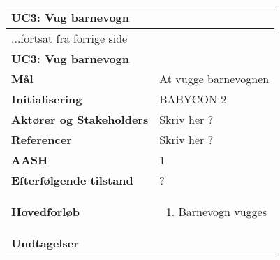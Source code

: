 \begin{center} \centering \label{kravspec:uc3}
	\begin{longtable}{|p{5cm}|p{9cm}|}  %
	\hline
		\multicolumn{2}{|l|}{\textbf{UC3: Vug barnevogn}} \\\hline %
		\endfirsthead
		
		\multicolumn{2}{l}{...fortsat fra forrige side} \\ \hline %
		\multicolumn{2}{|l|}{\textbf{UC3: Vug barnevogn}} \\\hline %
		\endhead	
		
		\textbf{Mål}							&At vugge barnevognen		\\\hline
		\textbf{Initialisering}				&BABYCON 2 		\\\hline
		\textbf{Aktører og Stakeholders}		&Skriv her ?		\\\hline 
		\textbf{Referencer}					&Skriv her ?		\\\hline
		\textbf{AASH}						&1		\\\hline
		\textbf{Efterfølgende tilstand}		&?	\\\hline
		\textbf{Hovedforløb}					
			&\begin{enumerate}
	
				\item  Barnevogn vugges
				
				
				
			\end{enumerate}
		\\\hline
		\textbf{Undtagelser}
			&\begin{enumerate}
			

				

			\end{enumerate}
		\\\hline
	\end{longtable} 
\end{center}

